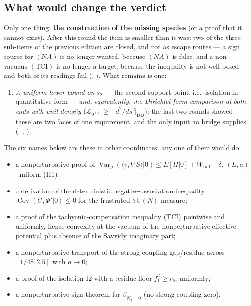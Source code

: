 \subsection{What would change the verdict}

Only one thing: \textbf{the construction of the missing species} (or a proof that it cannot exist).
After this round the item is smaller than it was: two of the three sub-items of the previous edition are
closed, and not as escape routes --- a sign source for $(NA)$ is no longer wanted, because $(NA)$ is
false, and a non-vacuous $(\mathrm{TCI})$ is no longer a target, because the inequality is not well posed
and both of its readings fail (, ). What remains is
one:

\begin{enumerate}
\item[(c)] \emph{A uniform lower bound on $s_2$} --- the second support point, i.e.\ isolation in
  quantitative form --- \emph{and, equivalently, the Dirichlet-form comparison at both ends with unit
  density} ($\mathcal L_{0^{++}}\ge-d^2/ds^2|_{\mathrm{DD}}$): the last two rounds showed these are two
  faces of one requirement, and the only input no bridge supplies (,
  , ).
\end{enumerate}

The six names below are these in other coordinates; any one of them would do:

\begin{itemize}
\item a nonperturbative proof of
  $\operatorname{Var}_\mu(\langle v,\nabla S\rangle|0)\le E[H|0]+W_{\mathrm{full}}-\delta$,
  $(L,a)$-uniform (H1);
\item a derivation of the deterministic negative-association inequality
  $\operatorname{Cov}(G,\Phi'|0)\le0$ for the frustrated $\mathrm{SU}(N)$ measure;
\item a proof of the tachyonic-compensation inequality (TCI) pointwise and uniformly, hence
  convexity-at-the-vacuum of the nonperturbative effective potential plus absence of the Savvidy
  imaginary part;
\item a nonperturbative transport of the strong-coupling gap/residue across $[1/48,2.5]$ with
  $a\to0$;
\item a proof of the isolation I2 with a residue floor $f_1^2\ge r_0$, uniformly;
\item a nonperturbative sign theorem for $\beta_{N_f=0}$ (no strong-coupling zero).
\end{itemize}


